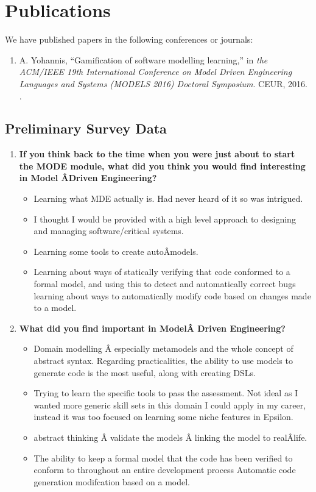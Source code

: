 \documentclass[12pt, a4paper]{report} \usepackage[titletoc]{appendix}
\begin{document}
\chapter{Publications}
\label{Publications}
We have published papers in the following conferences or journals: 
\begin{enumerate}
 \item A. Yohannis, ``Gamification of software modelling learning,'' in
 \textit{the ACM/IEEE 19th International Conference on Model Driven Engineering Languages and Systems (MODELS 2016) Doctoral Symposium}. CEUR, 2016. \cite{Yohannis2016}.
\end{enumerate}




\begin{appendices}
\chapter{Preliminary Survey Data}
\label{chap:Preliminary Survey Data}

\begin{enumerate}
\item \textbf{If you think back to the time when you were just about to start the MODE module, what did you think you would find interesting in Model Â­Driven Engineering?}
\begin{itemize}
\item Learning what MDE actually is. Had never heard of it so was intrigued.
\item I thought I would be provided with a high level approach to designing and managing software/critical systems.
\item Learning some tools to create autoÂ­models.
\item Learning about ways of statically verifying that code conformed to a formal model, and using this to detect and automatically correct bugs learning about ways to automatically modify code based on changes made to a model.
\end{itemize}

\item \textbf{What did you find important in ModelÂ­ Driven Engineering?}
\begin{itemize}
\item Domain modelling Â­ especially metamodels and the whole concept of abstract syntax. Regarding practicalities, the ability to use models to generate code is the most useful, along with creating DSLs.
\item Trying to learn the specific tools to pass the assessment. Not ideal as I wanted more generic
skill sets in this domain I could apply in my career, instead it was too focused on learning some niche features in Epsilon.
\item abstract thinking Â­ validate the models Â­ linking the model to realÂ­life.
\item The ability to keep a formal model that the code has been verified to conform to throughout
an entire development process Automatic code generation modifcation based on a model.
\end{itemize}


\end{enumerate}
\end{appendices}
\end{document}
